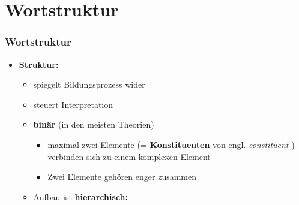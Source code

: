 \section{Wortstruktur}


\begin{frame}
\frametitle{Wortstruktur}
\begin{minipage}{.48\textwidth}
\begin{itemize}
	\item \textbf{Struktur:}
	
	\begin{itemize}
		\item spiegelt Bildungsprozess wider
		\item steuert Interpretation
		\item \textbf{binär} (in den meisten Theorien)
		
		\begin{itemize}
			\item maximal zwei Elemente (= \textbf{Konstituenten} von engl. \emph{constituent} ) verbinden sich zu einem komplexen Element
			\item Zwei Elemente gehören enger zusammen
		\end{itemize}
		\item[] \ras Aufbau ist \textbf{hierarchisch:}
	\end{itemize}
\end{itemize}
\end{minipage}\hfill%
\begin{minipage}{.48\textwidth}
\begin{figure}	
\centering
{}

\centering
{}
\end{figure}
\end{minipage}
\end{frame}


